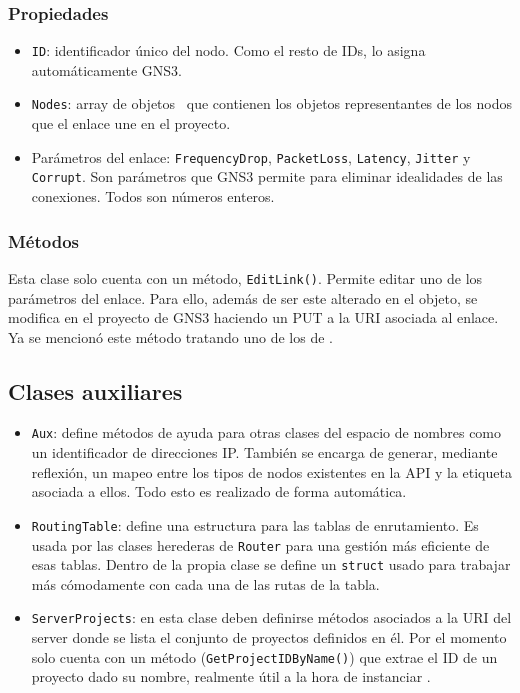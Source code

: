 \subsubsection{Propiedades}
\begin{itemize}
\item \texttt{ID}: identificador único del nodo. Como el resto de IDs, lo asigna automáticamente GNS3.
\item \texttt{Nodes}: array de objetos \NODE~que contienen los objetos representantes de los nodos que el enlace une en el proyecto.
\item Parámetros del enlace: \texttt{FrequencyDrop}, \texttt{PacketLoss}, \texttt{Latency}, \texttt{Jitter} y \texttt{Corrupt}. Son parámetros que GNS3 permite para eliminar idealidades de las conexiones. Todos son números enteros.
\end{itemize}

\subsubsection{Métodos}
Esta clase solo cuenta con un método, \texttt{EditLink()}. Permite editar uno de los parámetros del enlace. Para ello, además de ser este alterado en el objeto, se modifica en el proyecto de GNS3 haciendo un PUT a la URI asociada al enlace. Ya se mencionó este método tratando uno de los de \GNSCS.

\subsection{Clases auxiliares}\label{subsec:aux}
\begin{itemize}
\item \texttt{Aux}: define métodos de ayuda para otras clases del espacio de nombres como un identificador de direcciones IP. También se encarga de generar, mediante reflexión, un mapeo entre los tipos de nodos existentes en la API y la etiqueta asociada a ellos. Todo esto es realizado de forma automática.
\item \texttt{RoutingTable}: define una estructura para las tablas de enrutamiento. Es usada por las clases herederas de \texttt{Router} para una gestión más eficiente de esas tablas. Dentro de la propia clase se define un \texttt{struct} usado para trabajar más cómodamente con cada una de las rutas de la tabla. 
\item \texttt{ServerProjects}: en esta clase deben definirse métodos asociados a la URI del server donde se lista el conjunto de proyectos definidos en él. Por el momento solo cuenta con un método (\texttt{GetProjectIDByName()}) que extrae el ID de un proyecto dado su nombre, realmente útil a la hora de instanciar \GNSCS.
\end{itemize}

